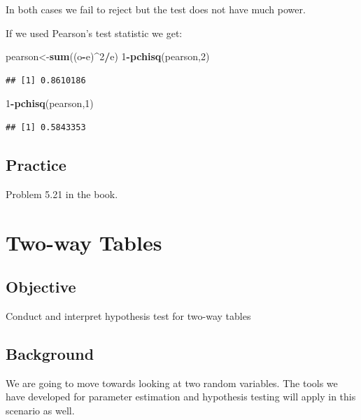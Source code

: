 \documentclass[]{book}
\newenvironment{Shaded}{\begin{snugshade}}{\end{snugshade}}
\newcommand{\KeywordTok}[1]{\textcolor[rgb]{0.13,0.29,0.53}{\textbf{#1}}}
\newcommand{\DecValTok}[1]{\textcolor[rgb]{0.00,0.00,0.81}{#1}}
\newcommand{\OperatorTok}[1]{\textcolor[rgb]{0.81,0.36,0.00}{\textbf{#1}}}
\newcommand{\NormalTok}[1]{#1}
\theoremstyle{definition}
\theoremstyle{definition}
\theoremstyle{definition}
\theoremstyle{remark}
\begin{document}
In both cases we fail to reject but the test does not have much power.

If we used Pearson's test statistic we get:

\begin{Shaded}
\begin{Highlighting}[]
\NormalTok{pearson<-}\KeywordTok{sum}\NormalTok{((o}\OperatorTok{-}\NormalTok{e)}\OperatorTok{^}\DecValTok{2}\OperatorTok{/}\NormalTok{e)}
\DecValTok{1}\OperatorTok{-}\KeywordTok{pchisq}\NormalTok{(pearson,}\DecValTok{2}\NormalTok{)}
\end{Highlighting}
\end{Shaded}

\begin{verbatim}
## [1] 0.8610186
\end{verbatim}

\begin{Shaded}
\begin{Highlighting}[]
\DecValTok{1}\OperatorTok{-}\KeywordTok{pchisq}\NormalTok{(pearson,}\DecValTok{1}\NormalTok{)}
\end{Highlighting}
\end{Shaded}

\begin{verbatim}
## [1] 0.5843353
\end{verbatim}

\subsection{Practice}\label{practice-13}

Problem 5.21 in the book.

\hypertarget{L28}{\section{Two-way Tables}\label{L28}}

\subsection{Objective}\label{objective-1}

Conduct and interpret hypothesis test for two-way tables

\subsection{Background}\label{background-5}

We are going to move towards looking at two random variables. The tools
we have developed for parameter estimation and hypothesis testing will
apply in this scenario as well.
\end{document}
